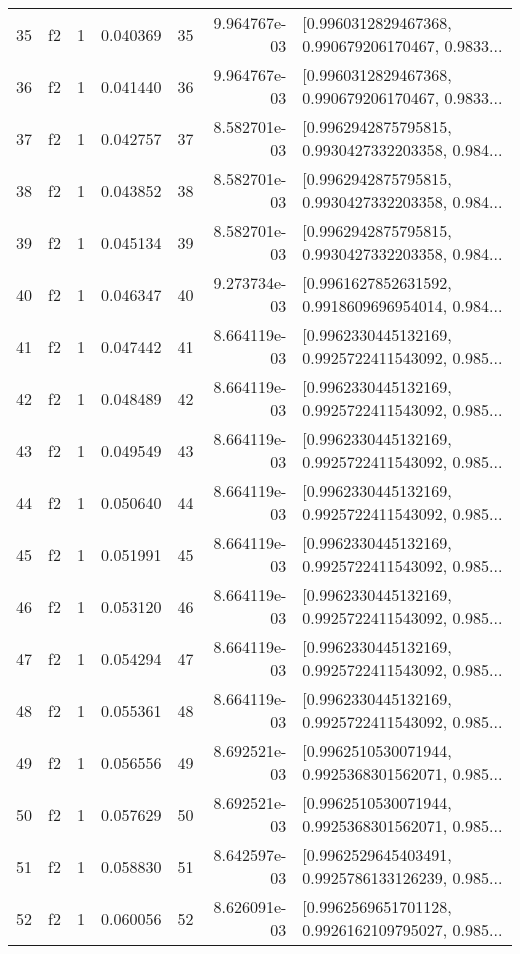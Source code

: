 \begin{tabular}{lllrlrl}
35  &  f2 &   1 &  0.040369 &   35 &  9.964767e-03 &  [0.9960312829467368, 0.990679206170467, 0.9833... \\
36  &  f2 &   1 &  0.041440 &   36 &  9.964767e-03 &  [0.9960312829467368, 0.990679206170467, 0.9833... \\
37  &  f2 &   1 &  0.042757 &   37 &  8.582701e-03 &  [0.9962942875795815, 0.9930427332203358, 0.984... \\
38  &  f2 &   1 &  0.043852 &   38 &  8.582701e-03 &  [0.9962942875795815, 0.9930427332203358, 0.984... \\
39  &  f2 &   1 &  0.045134 &   39 &  8.582701e-03 &  [0.9962942875795815, 0.9930427332203358, 0.984... \\
40  &  f2 &   1 &  0.046347 &   40 &  9.273734e-03 &  [0.9961627852631592, 0.9918609696954014, 0.984... \\
41  &  f2 &   1 &  0.047442 &   41 &  8.664119e-03 &  [0.9962330445132169, 0.9925722411543092, 0.985... \\
42  &  f2 &   1 &  0.048489 &   42 &  8.664119e-03 &  [0.9962330445132169, 0.9925722411543092, 0.985... \\
43  &  f2 &   1 &  0.049549 &   43 &  8.664119e-03 &  [0.9962330445132169, 0.9925722411543092, 0.985... \\
44  &  f2 &   1 &  0.050640 &   44 &  8.664119e-03 &  [0.9962330445132169, 0.9925722411543092, 0.985... \\
45  &  f2 &   1 &  0.051991 &   45 &  8.664119e-03 &  [0.9962330445132169, 0.9925722411543092, 0.985... \\
46  &  f2 &   1 &  0.053120 &   46 &  8.664119e-03 &  [0.9962330445132169, 0.9925722411543092, 0.985... \\
47  &  f2 &   1 &  0.054294 &   47 &  8.664119e-03 &  [0.9962330445132169, 0.9925722411543092, 0.985... \\
48  &  f2 &   1 &  0.055361 &   48 &  8.664119e-03 &  [0.9962330445132169, 0.9925722411543092, 0.985... \\
49  &  f2 &   1 &  0.056556 &   49 &  8.692521e-03 &  [0.9962510530071944, 0.9925368301562071, 0.985... \\
50  &  f2 &   1 &  0.057629 &   50 &  8.692521e-03 &  [0.9962510530071944, 0.9925368301562071, 0.985... \\
51  &  f2 &   1 &  0.058830 &   51 &  8.642597e-03 &  [0.9962529645403491, 0.9925786133126239, 0.985... \\
52  &  f2 &   1 &  0.060056 &   52 &  8.626091e-03 &  [0.9962569651701128, 0.9926162109795027, 0.985... \\

\end{tabular}
